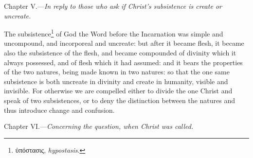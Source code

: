 
Chapter V.—\emph{In reply to those who ask if Christ’s subsistence is create or uncreate.}

The subsistence\footnote{\textgreek{ὑπόστασις}, \emph{hypostasis}.} of God the Word before the Incarnation was simple and uncompound, and incorporeal and uncreate: but after it became flesh, it became also the subsistence of the flesh, and became compounded of divinity which it always possessed, and of flesh which it had assumed: and it bears the properties of the two natures, being made known in two natures: so that the one same subsistence is both uncreate in divinity and create in humanity, visible and invisible. For otherwise we are compelled either to divide the one Christ and speak of two subsistences, or to deny the distinction between the natures and thus introduce change and confusion.


Chapter VI.—\emph{Concerning the question, when Christ was called.}

